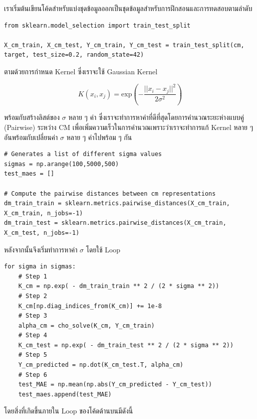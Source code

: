 เราเริ่มต้นเขียนโค้ดสำหรับแบ่งชุดข้อมูลออกเป็นชุดข้อมูลสำหรับการฝึกสอนและการทดสอบตามลำดับ
\begin{lstlisting}[style=MyPython]
from sklearn.model_selection import train_test_split

X_cm_train, X_cm_test, Y_cm_train, Y_cm_test = train_test_split(cm, target, test_size=0.2, random_state=42)
\end{lstlisting}

\noindent ตามด้วยการกำหนด Kernel ซึ่งเราจะใช้ Gaussian Kernel 

\begin{equation}\label{eq:gaussian_kernel}
    K(x_{i}, x_{j}) = \mathrm{exp}\left( -\frac{||x_i-x_j||^2}{2\sigma^2} \right)
\end{equation}

\noindent พร้อมกับสร้างลิสต์ของ $\sigma$ หลาย ๆ ค่า ซึ่งเราจะทำการหาค่าที่ดีที่สุดโดยการคำนวณระยะห่างแบบคู่ (Pairwise) ระหว่าง CM 
เพื่อเพิ่มความเร็วในการคำนวณเพราะว่าเราจะทำการแก้ Kernel หลาย ๆ อันพร้อมกับเปลี่ยนค่า $\sigma$ หลาย ๆ ค่าไปพร้อม ๆ กัน

\begin{lstlisting}[style=MyPython]
# Generates a list of different sigma values
sigmas = np.arange(100,5000,500) 
test_maes = []

# Compute the pairwise distances between cm representations
dm_train_train = sklearn.metrics.pairwise_distances(X_cm_train, X_cm_train, n_jobs=-1)
dm_train_test = sklearn.metrics.pairwise_distances(X_cm_train, X_cm_test, n_jobs=-1)
\end{lstlisting}

\noindent หลังจากนั้นจึงเริ่มทำการหาค่า $\sigma$ โดยใช้ Loop

\begin{lstlisting}[style=MyPython]
for sigma in sigmas:
    # Step 1
    K_cm = np.exp( - dm_train_train ** 2 / (2 * sigma ** 2)) 
    # Step 2
    K_cm[np.diag_indices_from(K_cm)] += 1e-8
    # Step 3
    alpha_cm = cho_solve(K_cm, Y_cm_train)
    # Step 4
    K_cm_test = np.exp( - dm_train_test ** 2 / (2 * sigma ** 2))
    # Step 5
    Y_cm_predicted = np.dot(K_cm_test.T, alpha_cm)
    # Step 6
    test_MAE = np.mean(np.abs(Y_cm_predicted - Y_cm_test))
    test_maes.append(test_MAE)
\end{lstlisting}

โดยสิ่งที่เกิดขึ้นภายใน Loop ของโค้ดด้านบนมีดังนี้

